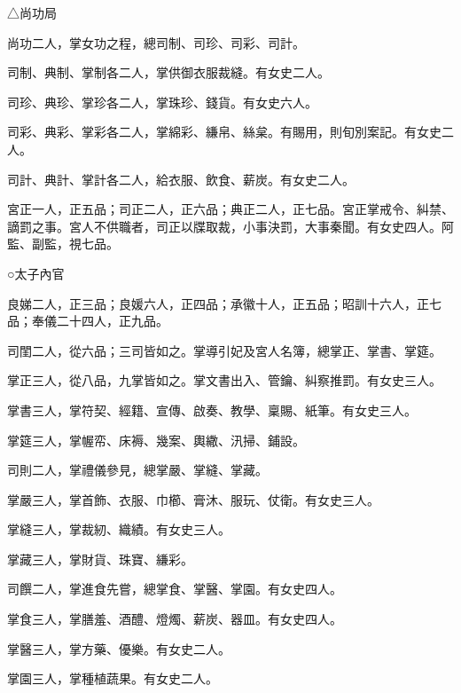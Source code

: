 \begin{pinyinscope}
 △尚功局



 尚功二人，掌女功之程，總司制、司珍、司彩、司計。



 司制、典制、掌制各二人，掌供御衣服裁縫。有女史二人。



 司珍、典珍、掌珍各二人，掌珠珍、錢貨。有女史六人。



 司彩、典彩、掌彩各二人，掌綿彩、縑帛、絲枲。有賜用，則旬別案記。有女史二人。



 司計、典計、掌計各二人，給衣服、飲食、薪炭。有女史二人。



 宮正一人，正五品；司正二人，正六品；典正二人，正七品。宮正掌戒令、糾禁、謫罰之事。宮人不供職者，司正以牒取裁，小事決罰，大事秦聞。有女史四人。阿監、副監，視七品。



 ○太子內官



 良娣二人，正三品；良媛六人，正四品；承徽十人，正五品；昭訓十六人，正七品；奉儀二十四人，正九品。



 司閨二人，從六品；三司皆如之。掌導引妃及宮人名簿，總掌正、掌書、掌筵。



 掌正三人，從八品，九掌皆如之。掌文書出入、管鑰、糾察推罰。有女史三人。



 掌書三人，掌符契、經籍、宣傳、啟奏、教學、稟賜、紙筆。有女史三人。



 掌筵三人，掌幄帟、床褥、幾案、輿繖、汛掃、鋪設。



 司則二人，掌禮儀參見，總掌嚴、掌縫、掌藏。



 掌嚴三人，掌首飾、衣服、巾櫛、膏沐、服玩、仗衛。有女史三人。



 掌縫三人，掌裁紉、織績。有女史三人。



 掌藏三人，掌財貨、珠寶、縑彩。



 司饌二人，掌進食先嘗，總掌食、掌醫、掌園。有女史四人。



 掌食三人，掌膳羞、酒醴、燈燭、薪炭、器皿。有女史四人。



 掌醫三人，掌方藥、優樂。有女史二人。



 掌園三人，掌種植蔬果。有女史二人。



\end{pinyinscope}